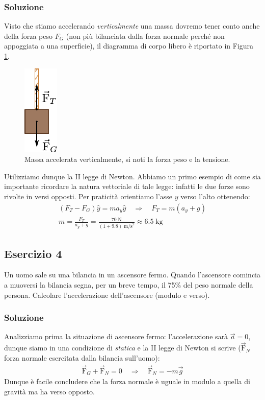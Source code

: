 \documentclass[12pt,a4paper]{book}
\begin{document}
\subsubsection*{Soluzione}
Visto che stiamo accelerando \textit{verticalmente} una massa dovremo tener conto anche della forza peso $F_G$ (non più bilanciata dalla forza normale perché non appoggiata a una superficie), il diagramma di corpo libero è riportato in Figura \ref{fig:4-e-3}.

\begin{figure}[!ht]
\centering
\includegraphics[scale=2]{e-3.pdf}
\caption{Massa accelerata verticalmente, si noti la forza peso e la tensione.} 
\label{fig:4-e-3} 
\end{figure}

Utilizziamo dunque la II legge di Newton. Abbiamo un primo esempio di come sia importante ricordare la natura vettoriale di tale legge: infatti le due forze sono rivolte in versi opposti. Per praticità orientiamo l'asse $y$ verso l'alto ottenendo:
%
\begin{gather*}
(F_T-F_G)\hat{y}=ma_y\hat{y} \quad \Longrightarrow \quad F_T= m(a_y+g) \\
m=\frac{F_T}{a_y+g}=\frac{70\;\text{N}}{(1+9.8)\;\text{m/s}^2}\approx 6.5\;\text{kg}
\end{gather*}
%

\subsection*{Esercizio 4}
Un uomo sale su una bilancia in un ascensore fermo. Quando l'ascensore comincia a muoversi la bilancia segna, per un breve tempo, il 75\% del peso normale della persona. Calcolare l'accelerazione dell'ascensore (modulo e verso). 

\subsubsection*{Soluzione}
Analizziamo prima la situazione di ascensore fermo: l'accelerazione sarà $\vec{a}=0$, dunque siamo in una condizione di \textit{statica} e la II legge di Newton si scrive ($\vec{\text{F}}_N$ forza normale esercitata dalla bilancia sull'uomo):
%
\begin{gather*}
\vec{\text{F}}_G+\vec{\text{F}}_N=0 \quad \Longrightarrow \quad \vec{\text{F}}_N=-m\vec{g}
\end{gather*}
%
Dunque è facile concludere che la forza normale è uguale in modulo a quella di gravità ma ha verso opposto.
\end{document}
